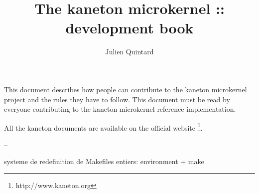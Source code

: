 %
%
%
%
%
%

%
%

\def\path{../..}

%
%



%
%

\rhead{}

%
%

\title{The kaneton microkernel :: development book
       \logos}

%
%

\author{\small{Julien Quintard}}

%
%



%
%

\maketitle

%
%

This document describes how people can contribute to the kaneton microkernel
project and the rules they have to follow. This document must be read by
everyone contributing to the kaneton microkernel reference implementation.

All the kaneton documents are available on
the official website
  \footnote{http://www.kaneton.org}.

%
%

\toc

%
%













%
%

--

systeme de redefinition de Makefiles entiers: environment + make

